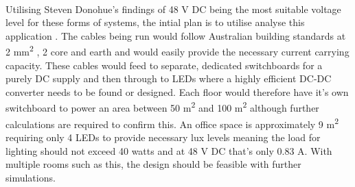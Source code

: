 \paragraph{}
Utilising Steven Donohue's findings of 48 V DC being the most suitable voltage level for these forms  of systems, the intial plan is to utilise analyse this application \cite{Donohue2014}. The cables being run would follow Australian building standards at 2 \si{mm^2} , 2 core and earth and would easily provide the necessary current carrying capacity. These cables would feed to separate, dedicated switchboards for a purely DC supply and then through to LEDs where a highly efficient DC-DC converter needs to be found or designed. Each floor would therefore have it's own switchboard to power an area between 50 \si{m^2} and 100 \si{m^2} although further calculations are required to confirm this. An office space is approximately 9 \si{m^2} requiring only 4 LEDs to provide necessary lux levels meaning the load for lighting should not exceed 40 watts and at 48 V DC that's only 0.83 \si{A}. With multiple rooms such as this, the design should be feasible with further simulations.  

\newpage